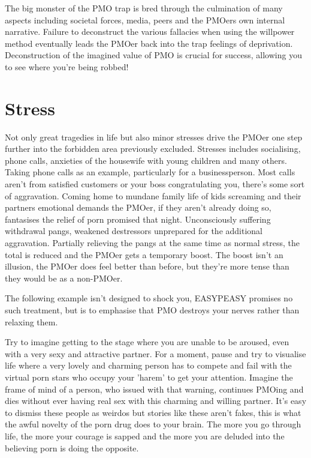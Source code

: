 \documentclass[easypeasy.tex]{subfiles}
\begin{document}
The big monster of the PMO trap is bred through the culmination of many aspects including societal forces, media, peers and the PMOers own internal narrative. Failure to deconstruct the various fallacies when using the willpower method eventually leads the PMOer back into the trap feelings of deprivation. Deconstruction of the imagined value of PMO is crucial for success, allowing you to see where you're being robbed!

\section{Stress}

Not only great tragedies in life but also minor stresses drive the PMOer one step further into the forbidden area previously excluded. Stresses includes socialising, phone calls, anxieties of the housewife with young children and many others. Taking phone calls as an example, particularly for a businessperson. Most calls aren't from satisfied customers or your boss congratulating you, there's some sort of aggravation. Coming home to mundane family life of kids screaming and their partners emotional demands the PMOer, if they aren't already doing so, fantasises the relief of porn promised that night. Unconsciously suffering withdrawal pangs, weakened destressors unprepared for the additional aggravation. Partially relieving the pangs at the same time as normal stress, the total is reduced and the PMOer gets a temporary boost. The boost isn't an illusion, the PMOer does feel better than before, but they're more tense than they would be as a non-PMOer.

The following example isn't designed to shock you, EASYPEASY promises no such treatment, but is to emphasise that PMO destroys your nerves rather than relaxing them.

Try to imagine getting to the stage where you are unable to be aroused, even with a very sexy and attractive partner. For a moment, pause and try to visualise life where a very lovely and charming person has to compete and fail with the virtual porn stars who occupy your 'harem' to get your attention. Imagine the frame of mind of a person, who issued with that warning, continues PMOing and dies without ever having real sex with this charming and willing partner. It's easy to dismiss these people as weirdos but stories like these aren't fakes, this is what the awful novelty of the porn drug does to your brain. The more you go through life, the more your courage is sapped and the more you are deluded into the believing porn is doing the opposite.
\end{document}
